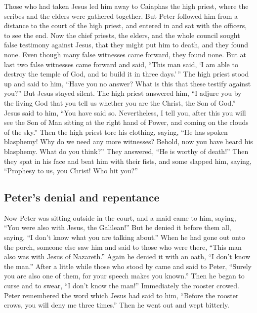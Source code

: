  Those who had taken Jesus led him away to Caiaphas the
high priest, where the scribes and the elders were gathered together.
 But Peter followed him from a distance to the court of
the high priest, and entered in and sat with the officers, to see the
end.  Now the chief priests, the elders, and the whole
council sought false testimony against Jesus, that they might put him to
death,  and they found none. Even though many false
witnesses came forward, they found none. But at last two false witnesses
came forward  and said, ``This man said, `I am able to
destroy the temple of God, and to build it in three days.'\,''
 The high priest stood up and said to him, ``Have you no
answer? What is this that these testify against you?'' 
But Jesus stayed silent. The high priest answered him, ``I adjure you by
the living God that you tell us whether you are the Christ, the Son of
God.''  Jesus said to him, ``You have said so.
Nevertheless, I tell you, after this you will see the Son of Man sitting
at the right hand of Power, and coming on the clouds of the sky.''
 Then the high priest tore his clothing, saying, ``He has
spoken blasphemy! Why do we need any more witnesses? Behold, now you
have heard his blasphemy.  What do you think?'' They
answered, ``He is worthy of death!''  Then they spat in
his face and beat him with their fists, and some slapped him,
 saying, ``Prophesy to us, you Christ! Who hit you?''

\hypertarget{peters-denial-and-repentance}{%
\subsection{Peter's denial and
repentance}\label{peters-denial-and-repentance}}

 Now Peter was sitting outside in the court, and a maid
came to him, saying, ``You were also with Jesus, the Galilean!''
 But he denied it before them all, saying, ``I don't know
what you are talking about.''  When he had gone out onto
the porch, someone else saw him and said to those who were there, ``This
man also was with Jesus of Nazareth.''  Again he denied
it with an oath, ``I don't know the man.''  After a
little while those who stood by came and said to Peter, ``Surely you are
also one of them, for your speech makes you known.'' 
Then he began to curse and to swear, ``I don't know the man!''
Immediately the rooster crowed.  Peter remembered the
word which Jesus had said to him, ``Before the rooster crows, you will
deny me three times.'' Then he went out and wept bitterly.

